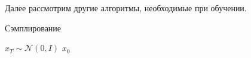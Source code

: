 \documentclass[11pt, a4paper, twocolumn, twoside]{article} %
\begin{document}
Далее рассмотрим другие алгоритмы, необходимые при обучении.
\begin{algorithm}
\caption{Сэмплирование}\label{alg:tree}
$x_T\sim\mathcal{N}(0, I)$\;
\Return $x_0$
\end{algorithm}




\newpage


\end{document}
